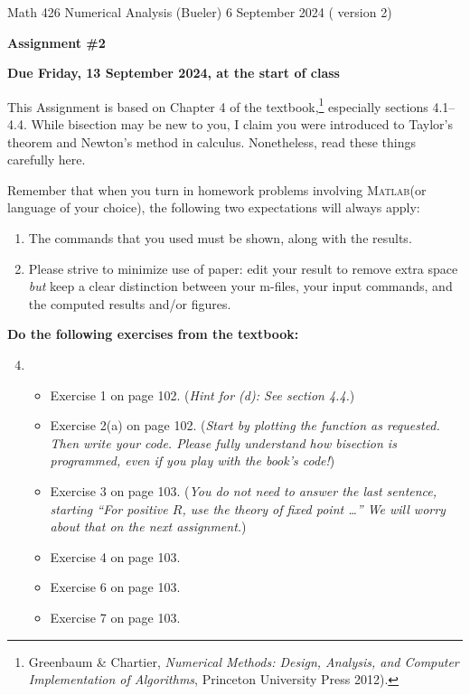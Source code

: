 \documentclass[12pt]{amsart}
\newcommand{\Matlab}{\textsc{Matlab}\xspace}
\begin{document}
\scriptsize \noindent Math 426 Numerical Analysis (Bueler) \hfill 6 September 2024 ({\color{red} version 2})
\normalsize

\medskip\bigskip

\Large\centerline{\textbf{Assignment \#2}}
\large
\bigskip

\centerline{\textbf{Due Friday, 13 September 2024, at the start of class}}
\bigskip
\normalsize

\thispagestyle{empty}

This Assignment is based on Chapter 4 of the textbook,\footnote{Greenbaum \& Chartier, \emph{Numerical Methods: Design, Analysis, and Computer Implementation of Algorithms}, Princeton University Press 2012).}  especially sections 4.1--4.4.  While bisection may be new to you, I claim you were introduced to Taylor's theorem and Newton's method in calculus.  Nonetheless, read these things carefully here.

\bigskip
\noindent Remember that when you turn in homework problems involving \Matlab (or language of your choice), the following two expectations will always apply:
\renewcommand{\labelenumi}{\arabic{enumi}.\,}
\begin{enumerate}
\item The commands that you used must be shown, along with the results.
\item Please strive to minimize use of paper: edit your result to remove extra space \emph{but} keep a clear distinction between your m-files, your input commands, and the computed results and/or figures.
\end{enumerate}

\bigskip\bigskip
\noindent \textbf{Do the following exercises from the textbook:}

\medskip
\renewcommand{\labelenumi}{{\footnotesize\underline{\textsc{Chapter \arabic{enumi}}}}}
\begin{enumerate}
\setcounter{enumi}{3}
\item ~
    \begin{itemize}
    \item Exercise 1 on page 102.  (\emph{Hint for (d): See section 4.4.})
    \item Exercise 2(a) on page 102.  (\emph{Start by plotting the function as requested.  Then write your code.  Please fully understand how bisection is programmed, even if you play with the book's code!})
    \item Exercise 3 on page 103.  {\color{red} (\emph{You do not need to answer the last sentence, starting ``For positive $R$, use the theory of fixed point \dots''  We will worry about that on the next assignment.})}
    \item Exercise 4 on page 103.
    \item Exercise 6 on page 103.
    \item Exercise 7 on page 103.
    \end{itemize}
\end{enumerate}
\end{document}
